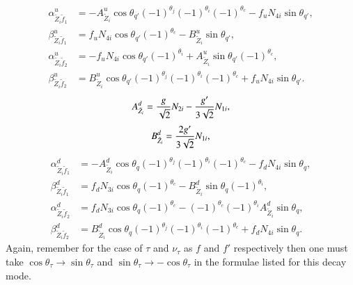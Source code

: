 \documentclass[final,3p,times,pdflatex]{elsarticle}
\begin{document}
\begin{align}
\alpha_{\tilde{Z}_{i} \tilde{f}_1}^{u} &= -A_{\tilde{Z}_{i}}^{u}\cos\theta_{q'} (-1)^{\theta_j} (-1)^{\theta_i}(-1)^{\theta_c} - f_{u}N_{4i}\sin\theta_{q'}, \\
\beta_{\tilde{Z}_{i} \tilde{f}_1}^{u} &= f_{u}N_{4i}\cos\theta_{q'}(-1)^{\theta_c} - B_{\tilde{Z}_{i}}^{u}\sin\theta_{q'}, \\
\alpha_{\tilde{Z}_{i} \tilde{f}_2}^{u} &= -f_{u}N_{4i}\cos\theta_{q'}(-1)^{\theta_i} + A_{\tilde{Z}_{i}}^{u}\sin\theta_{q'}(-1)^{\theta_c}, \\
\beta_{\tilde{Z}_{i} \tilde{f}_2}^{u} &= B_{\tilde{Z}_{i}}^{u}\cos\theta_{q'}(-1)^{\theta_j}(-1)^{\theta_i}(-1)^{\theta_c} + f_{u}N_{4i}\sin\theta_{q'}.
\end{align}
\begin{equation}
A_{\tilde{Z}_{i}}^{d} = {g \over \sqrt{2}}N_{2i} - {g' \over 3 \sqrt{2}}N_{1i},
\end{equation}
\begin{equation}
B_{\tilde{Z}_{i}}^{d} = {2g' \over 3 \sqrt{2}}N_{1i},
\end{equation}
\begin{align}
\alpha_{\tilde{Z}_{i} \tilde{f}_1}^{d} &= -A_{\tilde{Z}_{i}}^{d}\cos\theta_{q}(-1)^{\theta_j}(-1)^{\theta_i}(-1)^{\theta_c} - f_{d}N_{4i}\sin\theta_{q}, \\
\beta_{\tilde{Z}_{i} \tilde{f}_1}^{d} &= f_{d}N_{3i}\cos\theta_{q} (-1)^{\theta_c} - B_{\tilde{Z}_{i}}^{d}\sin\theta_{q}(-1)^{\theta_i}, \\
\alpha_{\tilde{Z}_{i} \tilde{f}_2}^{d} &= f_{d}N_{3i}\cos\theta_{q}(-1)^{\theta_c} - (-1)^{\theta_c}(-1)^{\theta_i} A_{\tilde{Z}_{i}}^{d}\sin\theta_{q}, \\
\beta_{\tilde{Z}_{i} \tilde{f}_2}^{d} &= B_{\tilde{Z}_{i}}^{d}\cos\theta_{q}(-1)^{\theta_j}(-1)^{\theta_i}(-1)^{\theta_c} + f_{d}N_{4i}\sin\theta_q.
\end{align}
Again, remember for the case of $\tau$ and $\nu_{\tau}$ as $f$ and $f'$ respectively then one must take $\cos\theta_{\tau} \rightarrow \sin\theta_{\tau}$ and $\sin\theta_{\tau} \rightarrow -\cos\theta_{\tau}$ in the formulae listed for this decay mode. 
\end{document}
